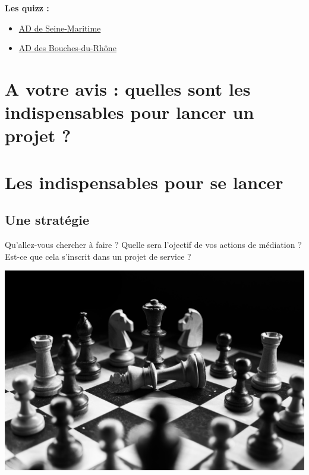 \documentclass[
  letterpaper,
  DIV=11,
  numbers=noendperiod]{scrartcl}
\begin{document}
\textbf{Les quizz :}

\begin{itemize}
\item
  \href{https://www.archivesdepartementales76.net/quizz/quizzbyid/n:182}{AD
  de Seine-Maritime}
\item
  \href{https://www.archives13.fr/n/quiz-aco/n:239}{AD des
  Bouches-du-Rhône}
\end{itemize}

\section{A votre avis : quelles sont les indispensables pour lancer un
projet
?}\label{a-votre-avis-quelles-sont-les-indispensables-pour-lancer-un-projet}

\section{Les indispensables pour se
lancer}\label{les-indispensables-pour-se-lancer}

\subsection{Une stratégie}\label{une-stratuxe9gie}

Qu'allez-vous chercher à faire ? Quelle sera l'ojectif de vos actions de
médiation ? Est-ce que cela s'inscrit dans un projet de service ?

\begin{center}
\includegraphics{img/felix-mittermeier-nAjil1z3eLk-unsplash.jpg}
\end{center}
\end{document}
